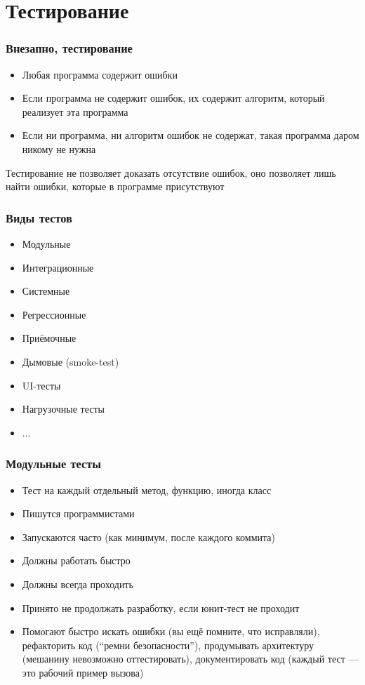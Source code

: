 \documentclass[xetex,mathserif,serif]{beamer}
\begin{document}
	\section{Тестирование}

	\begin{frame}
		\frametitle{Внезапно, тестирование}
		\begin{itemize}
			\item Любая программа содержит ошибки
			\item Если программа не содержит ошибок, их содержит алгоритм, который реализует эта программа
			\item Если ни программа, ни алгоритм ошибок не содержат, такая программа даром никому не нужна
		\end{itemize}
		Тестирование не позволяет доказать отсутствие ошибок, оно позволяет лишь найти ошибки, которые в программе присутствуют
	\end{frame}

	\begin{frame}
		\frametitle{Виды тестов}
		\begin{itemize}
			\item Модульные
			\item Интеграционные
			\item Системные
		\end{itemize}
		\begin{itemize}
			\item Регрессионные
			\item Приёмочные
			\item Дымовые (smoke-test)
		\end{itemize}
		\begin{itemize}
			\item UI-тесты
			\item Нагрузочные тесты
			\item ...
		\end{itemize}
	\end{frame}

	\begin{frame}
		\frametitle{Модульные тесты}
		\begin{itemize}
			\item Тест на каждый отдельный метод, функцию, иногда класс
			\item Пишутся программистами
			\item Запускаются часто (как минимум, после каждого коммита)
			\item Должны работать быстро
			\item Должны всегда проходить 
			\item Принято не продолжать разработку, если юнит-тест не проходит
			\item Помогают быстро искать ошибки (вы ещё помните, что исправляли), рефакторить код (``ремни безопасности''), продумывать архитектуру (мешанину невозможно оттестировать), документировать код (каждый тест --- это рабочий пример вызова)
		\end{itemize}
	\end{frame}
\end{document}
